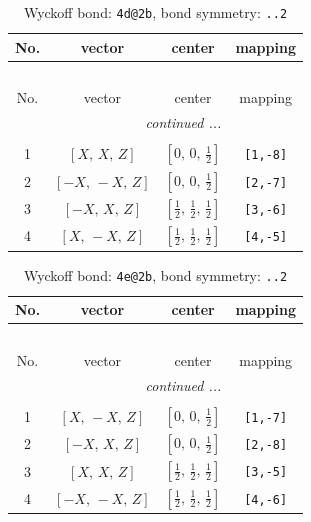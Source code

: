 \documentclass[fleqn,8pt]{jsarticle}
\begin{document}
\begin{longtable}{cccc}
\caption{Wyckoff bond: {\tt 4d@2b}, bond symmetry: {\tt ..2}}
 \\
 \hline \hline
No. & vector & center & mapping \\ \hline \endfirsthead

\multicolumn{3}{l}{\tablename\ \thetable{}} \\
 \hline \hline
No. & vector & center & mapping \\ \hline \endhead

 \hline \hline
\multicolumn{3}{r}{\footnotesize\it continued ...} \\ \endfoot

 \hline \hline
\multicolumn{3}{r}{} \\ \endlastfoot

1 & $\left[ X,\, X,\, Z \right]$ & $\left[ 0,\, 0,\, \frac{1}{2} \right]$ & {\tt [1,-8]} \\ \hline
2 & $\left[ - X,\, - X,\, Z \right]$ & $\left[ 0,\, 0,\, \frac{1}{2} \right]$ & {\tt [2,-7]} \\ \hline
3 & $\left[ - X,\, X,\, Z \right]$ & $\left[ \frac{1}{2},\, \frac{1}{2},\, \frac{1}{2} \right]$ & {\tt [3,-6]} \\ \hline
4 & $\left[ X,\, - X,\, Z \right]$ & $\left[ \frac{1}{2},\, \frac{1}{2},\, \frac{1}{2} \right]$ & {\tt [4,-5]} \\
\end{longtable}
\renewcommand{\arraystretch}{1.2}
\begin{longtable}{cccc}
\caption{Wyckoff bond: {\tt 4e@2b}, bond symmetry: {\tt ..2}}
 \\
 \hline \hline
No. & vector & center & mapping \\ \hline \endfirsthead

\multicolumn{3}{l}{\tablename\ \thetable{}} \\
 \hline \hline
No. & vector & center & mapping \\ \hline \endhead

 \hline \hline
\multicolumn{3}{r}{\footnotesize\it continued ...} \\ \endfoot

 \hline \hline
\multicolumn{3}{r}{} \\ \endlastfoot

1 & $\left[ X,\, - X,\, Z \right]$ & $\left[ 0,\, 0,\, \frac{1}{2} \right]$ & {\tt [1,-7]} \\ \hline
2 & $\left[ - X,\, X,\, Z \right]$ & $\left[ 0,\, 0,\, \frac{1}{2} \right]$ & {\tt [2,-8]} \\ \hline
3 & $\left[ X,\, X,\, Z \right]$ & $\left[ \frac{1}{2},\, \frac{1}{2},\, \frac{1}{2} \right]$ & {\tt [3,-5]} \\ \hline
4 & $\left[ - X,\, - X,\, Z \right]$ & $\left[ \frac{1}{2},\, \frac{1}{2},\, \frac{1}{2} \right]$ & {\tt [4,-6]} \\
\end{longtable}
\end{document}
